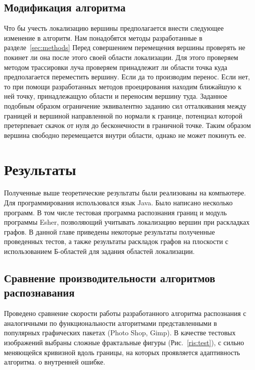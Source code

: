 \documentclass[a4paper,12pt]{report}
\begin{document}
\section{Модификация алгоритма}
Что бы учесть локализацию вершины предполагается внести следующее изменение в алгоритм. Нам понадобятся методы разработанные в разделе~\ref{sec:methods} Перед совершением перемещения вершины проверять не покинет ли она после этого своей области локализации. Для этого проверяем методом трассировки луча проверяем принадлежит ли области точка куда предполагается переместить вершину. Если да то производим перенос. Если нет, то при помощи разработанных методов проецирования находим ближайшую к ней точку, принадлежащую области и переносим вершину туда. Заданное подобным образом ограничение эквивалентно заданию сил отталкивания между границей и вершиной направленной по нормали к границе, потенциал которой претерпевает скачок от нуля до бесконечности в граничной точке. Таким образом вершина свободно перемещается внутри области, однако не может покинуть ее.

\chapter{Результаты}
Полученные выше теоретические результаты были реализованы на компьютере. Для программирования использовался язык Java. Было написано несколько программ. В том числе тестовая программа распознания границ и модуль программы Esher, позволяющий учитывать локализацию вершин при раскладках графов. В данной главе приведены некоторые результаты полученные проведенных тестов, а также результаты раскладок графов на плоскости с использованием Б-областей для задания областей локализации.

\section{Сравнение производительности алгоритмов распознавания}
Проведено сравнение скорости работы разработанного алгоритма распознания с аналогичными по функциональности алгоритмами представленными в популярных графических пакетах (Photo Shop, Gimp). В качестве тестовых изображений выбраны сложные фрактальные фигуры (Рис.~\ref{ris:test}), с сильно меняющейся кривизной вдоль границы, на которых проявляется адаптивность алгоритма.  о внутренней ошибке.
\end{document}
